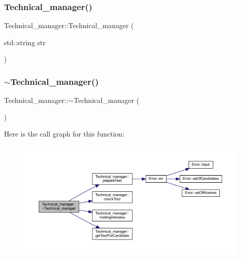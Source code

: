 \hypertarget{class_technical__manager_a94825f367005fbf7eb9e27cc2550ad3f}{}\label{class_technical__manager_a94825f367005fbf7eb9e27cc2550ad3f} 
\subsubsection{\texorpdfstring{Technical\+\_\+manager()}{Technical\_manager()}\hspace{0.1cm}{\footnotesize\ttfamily [4/4]}}
{\footnotesize\ttfamily Technical\+\_\+manager\+::\+Technical\+\_\+manager (\begin{DoxyParamCaption}\item[{std\+::string}]{str }\end{DoxyParamCaption})}

\hypertarget{class_technical__manager_a661af9604ec1a388e33a20c9497efb71}{}\label{class_technical__manager_a661af9604ec1a388e33a20c9497efb71} 
\subsubsection{\texorpdfstring{$\sim$\+Technical\+\_\+manager()}{~Technical\_manager()}}
{\footnotesize\ttfamily Technical\+\_\+manager\+::$\sim$\+Technical\+\_\+manager (\begin{DoxyParamCaption}{ }\end{DoxyParamCaption})\hspace{0.3cm}{\ttfamily [inline]}}

Here is the call graph for this function\+:
\nopagebreak
\begin{figure}[H]
\begin{center}
\leavevmode
\includegraphics[width=350pt]{class_technical__manager_a661af9604ec1a388e33a20c9497efb71_cgraph}
\end{center}
\end{figure}


